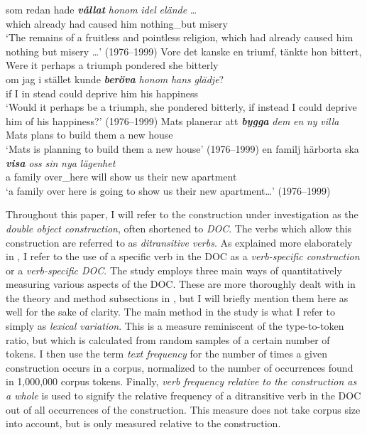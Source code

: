 \documentclass[output=paper]{langscibook}
\begin{document}
\gll som     redan      hade \textbf{\textit{vållat}} \textit{honom}  \textit{idel}        \textit{elände} …\\
  which already    had    caused    him    nothing\_but    misery\\
\glt ‘The remains of a fruitless and pointless religion, which had already caused him nothing but misery …’ (1976--1999)
\ex
\gll Vore   det   kanske    en   triumf,   tänkte       hon bittert,\\
  Were   it perhaps  a    triumph  pondered  she  bitterly  \\

\gll om  jag   i   stället  kunde \textbf{\textit{beröva}} \textit{honom}    \textit{hans}  \textit{glädje}?\\
  if    I      in    stead    could   deprive  him      his    happiness\\
\glt ‘Would it perhaps be a triumph, she pondered bitterly, if instead I could deprive him of his happiness?’ (1976--1999)
\ex
\gll Mats  planerar    att \textbf{\textit{bygga}} \textit{dem}  \textit{en}  \textit{ny}      \textit{villa}\\
  Mats    plans         to    build    them  a    new    house\\
\glt `Mats is planning to build them a new house’ (1976--1999)
\ex \label{ex:valdeson:7}
\gll en    familj    härborta  ska \textbf{\textit{visa}} \textit{oss}   \textit{sin}    \textit{nya}   \textit{lägenhet}\\
  a      family    over\_here  will    show  us   their  new  apartment\\
\glt `a family over here is going to show us their new apartment…’ (1976--1999)
\z


Throughout this paper, I will refer to the construction under investigation as the \textit{double object construction}, often shortened to \textit{DOC}. The verbs which allow this construction are referred to as \textit{ditransitive verbs}. As explained more elaborately in , I refer to the use of a specific verb in the DOC as a \textit{verb-specific construction} or a \textit{verb-specific DOC}. The study employs three main ways of quantitatively measuring various aspects of the DOC. These are more thoroughly dealt with in the theory and method subsections in , but I will briefly mention them here as well for the sake of clarity. The main method in the study is what I refer to simply as \textit{lexical variation}. This is a measure reminiscent of the type-to-token ratio, but which is calculated from random samples of a certain number of tokens. I then use the term \textit{text frequency} for the number of times a given construction occurs in a corpus, normalized to the number of occurrences found in 1,000,000 corpus tokens. Finally, \textit{verb frequency relative to the construction as a whole} is used to signify the relative frequency of a ditransitive verb in the DOC out of all occurrences of the construction. This measure does not take corpus size into account, but is only measured relative to the construction.
\end{document}
